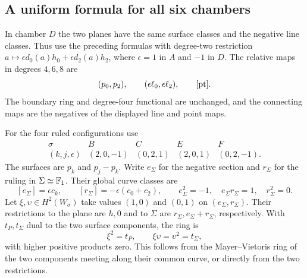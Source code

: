 \subsection{A uniform formula for all six chambers}
In chamber $D$ the two planes have the same surface classes
and the negative line classes. Thus use the preceding formulas
with degree-two restriction $a\mapsto\epsilon d_0(a)h_0+
\epsilon d_2(a)h_2$, where $\epsilon=1$ in $A$ and $-1$ in
$D$. The relative maps in degrees $4,6,8$ are
\begin{equation}\label{eq:two-plane-relative}
 (p_0,p_2),\qquad (\epsilon\ell_0,\epsilon\ell_2),\qquad[\mathrm{pt}].
\end{equation}
The boundary ring and degree-four functional are unchanged,
and the connecting maps are the negatives of the displayed
line and point maps.

For the four ruled configurations use
\begin{equation}\label{eq:ruled-template}
 \begin{array}{c|rrrr}
 \sigma&B&C&E&F\\\hline
 (k,j,\epsilon)&(2,0,-1)&(0,2,1)&(2,0,1)&(0,2,-1).
 \end{array}
\end{equation}
The surfaces are $p_k$ and $p_j-p_k$. Write $e_\Sigma$ for
the negative section and $r_\Sigma$ for the ruling in
$\Sigma\simeq\mathbb F_1$. Their global curve classes are
\begin{equation}\label{eq:ruled-curves}
 [e_\Sigma]=\epsilon c_k,\qquad
 [r_\Sigma]=-\epsilon(c_0+c_2),\qquad
 e_\Sigma^2=-1,\quad e_\Sigma r_\Sigma=1,\quad r_\Sigma^2=0.
\end{equation}
Let $\xi,\upsilon\in H^2(W_\sigma)$ take values $(1,0)$
and $(0,1)$ on $(e_\Sigma,r_\Sigma)$. Their restrictions
to the plane are $h,0$ and to $\Sigma$ are
$r_\Sigma,e_\Sigma+r_\Sigma$, respectively. With
$t_P,t_\Sigma$ dual to the two surface components, the ring is
\begin{equation}\label{eq:ruled-W}
 \xi^2=t_P,\qquad \xi\upsilon=\upsilon^2=t_\Sigma,
\end{equation}
with higher positive products zero. This follows from the
Mayer--Vietoris ring of the two components meeting along
their common curve, or directly from the two restrictions.

